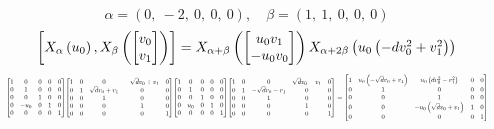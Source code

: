 \documentclass[11pt]{article}
\theoremstyle{definition}
\begin{document}
\[
\alpha = \left( 0, \  -2, \  0, \  0, \  0\right), \quad \beta = \left( 1, \  1, \  0, \  0, \  0\right)
\]
\[
\scaletoalign{\textwidth}{\left[ X_{\alpha}\left(u_{0}\right), X_{\beta}\left(\left[\begin{matrix}v_{0}\\v_{1}\end{matrix}\right]\right) \right] = X_{\alpha + \beta}\left(\left[\begin{matrix}u_{0} v_{1}\\- u_{0} v_{0}\end{matrix}\right]\right) X_{\alpha + 2\beta}\left(u_{0} \left(- d v_{0}^{2} + v_{1}^{2}\right)\right)}
\]
\[
\scaletoalign{\textwidth}{{\left[\begin{matrix}1 & 0 & 0 & 0 & 0\\0 & 1 & 0 & 0 & 0\\0 & 0 & 1 & 0 & 0\\0 & - u_{0} & 0 & 1 & 0\\0 & 0 & 0 & 0 & 1\end{matrix}\right]} {\left[\begin{matrix}1 & 0 & 0 & - \sqrt{d} v_{0} + v_{1} & 0\\0 & 1 & \sqrt{d} v_{0} + v_{1} & 0 & 0\\0 & 0 & 1 & 0 & 0\\0 & 0 & 0 & 1 & 0\\0 & 0 & 0 & 0 & 1\end{matrix}\right]} {\left[\begin{matrix}1 & 0 & 0 & 0 & 0\\0 & 1 & 0 & 0 & 0\\0 & 0 & 1 & 0 & 0\\0 & u_{0} & 0 & 1 & 0\\0 & 0 & 0 & 0 & 1\end{matrix}\right]} {\left[\begin{matrix}1 & 0 & 0 & \sqrt{d} v_{0} - v_{1} & 0\\0 & 1 & - \sqrt{d} v_{0} - v_{1} & 0 & 0\\0 & 0 & 1 & 0 & 0\\0 & 0 & 0 & 1 & 0\\0 & 0 & 0 & 0 & 1\end{matrix}\right]} = {\left[\begin{matrix}1 & u_{0} \left(- \sqrt{d} v_{0} + v_{1}\right) & u_{0} \left(d v_{0}^{2} - v_{1}^{2}\right) & 0 & 0\\0 & 1 & 0 & 0 & 0\\0 & 0 & 1 & 0 & 0\\0 & 0 & - u_{0} \left(\sqrt{d} v_{0} + v_{1}\right) & 1 & 0\\0 & 0 & 0 & 0 & 1\end{matrix}\right]}}
\]
\end{document}

